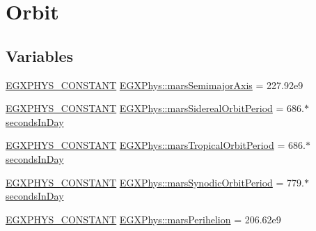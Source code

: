 \hypertarget{group___e_g_x_phys-_constants-_astrophysics-_solar_system-_mars-_orbit}{}\section{Orbit}
\label{group___e_g_x_phys-_constants-_astrophysics-_solar_system-_mars-_orbit}
\subsection*{Variables}
\begin{DoxyCompactItemize}
\item 
\mbox{\hyperlink{group___e_g_x_phys-_constants-_macros_ga76980d288494ce1714c9ac68a95ba702}{E\+G\+X\+P\+H\+Y\+S\+\_\+\+C\+O\+N\+S\+T\+A\+NT}} \mbox{\hyperlink{group___e_g_x_phys-_constants-_astrophysics-_solar_system-_mars-_orbit_ga935e021c979125036dac5a579fd3d2eb}{E\+G\+X\+Phys\+::mars\+Semimajor\+Axis}} = 227.\+92e9
\item 
\mbox{\hyperlink{group___e_g_x_phys-_constants-_macros_ga76980d288494ce1714c9ac68a95ba702}{E\+G\+X\+P\+H\+Y\+S\+\_\+\+C\+O\+N\+S\+T\+A\+NT}} \mbox{\hyperlink{group___e_g_x_phys-_constants-_astrophysics-_solar_system-_mars-_orbit_gae41c786d33b9f7f2f5b1db07e4ed6fbf}{E\+G\+X\+Phys\+::mars\+Sidereal\+Orbit\+Period}} = 686.$\ast$\mbox{\hyperlink{namespace_e_g_x_phys_a93d2a00d75411b58cbf63ab3fd1f8bc2}{seconds\+In\+Day}}
\item 
\mbox{\hyperlink{group___e_g_x_phys-_constants-_macros_ga76980d288494ce1714c9ac68a95ba702}{E\+G\+X\+P\+H\+Y\+S\+\_\+\+C\+O\+N\+S\+T\+A\+NT}} \mbox{\hyperlink{group___e_g_x_phys-_constants-_astrophysics-_solar_system-_mars-_orbit_ga9e1a81e54fd81e73f73d068fb0e0c4a6}{E\+G\+X\+Phys\+::mars\+Tropical\+Orbit\+Period}} = 686.$\ast$\mbox{\hyperlink{namespace_e_g_x_phys_a93d2a00d75411b58cbf63ab3fd1f8bc2}{seconds\+In\+Day}}
\item 
\mbox{\hyperlink{group___e_g_x_phys-_constants-_macros_ga76980d288494ce1714c9ac68a95ba702}{E\+G\+X\+P\+H\+Y\+S\+\_\+\+C\+O\+N\+S\+T\+A\+NT}} \mbox{\hyperlink{group___e_g_x_phys-_constants-_astrophysics-_solar_system-_mars-_orbit_ga60cfc74b2c60bd2134f7a500917e3628}{E\+G\+X\+Phys\+::mars\+Synodic\+Orbit\+Period}} = 779.$\ast$\mbox{\hyperlink{namespace_e_g_x_phys_a93d2a00d75411b58cbf63ab3fd1f8bc2}{seconds\+In\+Day}}
\item 
\mbox{\hyperlink{group___e_g_x_phys-_constants-_macros_ga76980d288494ce1714c9ac68a95ba702}{E\+G\+X\+P\+H\+Y\+S\+\_\+\+C\+O\+N\+S\+T\+A\+NT}} \mbox{\hyperlink{group___e_g_x_phys-_constants-_astrophysics-_solar_system-_mars-_orbit_gad152fa1e3e334641feaa60c0ddc96ac5}{E\+G\+X\+Phys\+::mars\+Perihelion}} = 206.\+62e9

\end{DoxyCompactItemize}
